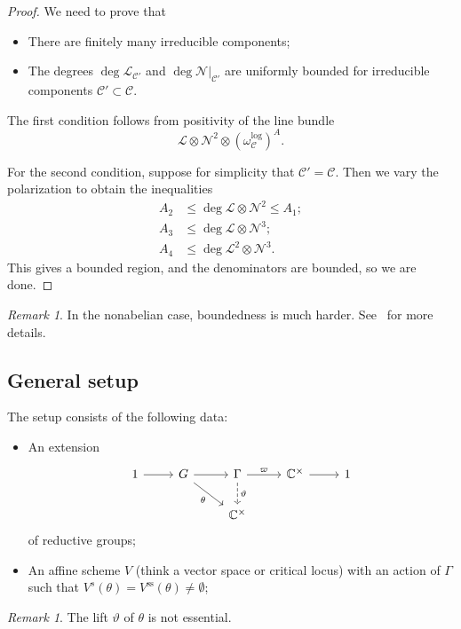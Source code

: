 \documentclass[10pt,oldfontcommands,oneside]{memoir}
\theoremstyle{definition}
\theoremstyle{remark}
\newtheorem{rmk}[thm]{Remark}
\theoremstyle{plain}
\theoremstyle{definition}
\theoremstyle{remark}
\newcommand{\C}{\mathbb{C}}
\newcommand{\mc}[1]{\mathcal{#1}}
\newcommand{\mr}[1]{\mathrm{#1}}
\newcommand{\1}{\mathbf{1}}
\newcommand{\2}{\mathbf{2}}
\newcommand{\3}{\mathbf{3}}
\begin{document}
\begin{proof}
    We need to prove that
    \begin{itemize}
        \item There are finitely many irreducible components;
        \item The degrees $\deg \mc{L}_{\mc{C}'}$ and $\deg \mc{N}|_{\mc{C}'}$ are uniformly bounded for irreducible components $\mc{C}' \subset \mc{C}$.
    \end{itemize}
    The first condition follows from positivity of the line bundle
    \[ \mc{L} \otimes \mc{N}^2 \otimes (\omega_{\mc{C}}^{\log})^A. \]
    
    For the second condition, suppose for simplicity that $\mc{C}' = \mc{C}$. Then we vary the polarization to obtain the inequalities
    \begin{align*}
        A_2 &\leq \deg \mc{L} \otimes \mc{N}^2 \leq A_1; \\
        A_3 &\leq \deg \mc{L} \otimes \mc{N}^3; \\
        A_4 &\leq \deg \mc{L}^2 \otimes \mc{N}^3 .
    \end{align*}
    This gives a bounded region, and the denominators are bounded, so we are done.
\end{proof}

\begin{rmk}
    In the nonabelian case, boundedness is much harder. See~\cite{bounded} for more details.  
\end{rmk}

\subsection{General setup}%
\label{sub:General setup}

The setup consists of the following data:
\begin{itemize}
    \item An extension
        \begin{equation*}
        \begin{tikzcd}
            1 \ar{r} & G \ar{r} \ar[swap]{dr}{\theta} & \Gamma \ar{r}{\varpi} \ar[dashrightarrow]{d}{\vartheta} & \C^{\times} \ar{r} & 1 \\
            & & \C^{\times}
        \end{tikzcd}
        \end{equation*}
        of reductive groups;
    \item An affine scheme $V$ (think a vector space or critical locus) with an action of $\Gamma$ such that $V^s(\theta) = V^{\mr{ss}}(\theta) \neq \emptyset$;
\end{itemize}
\begin{rmk}
    The lift $\vartheta$ of $\theta$ is not essential.
\end{rmk}
\end{document}
